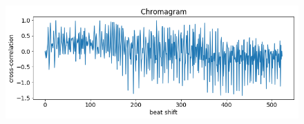 \documentclass[12pt]{FSUBeamer_official}
\begin{document}
\begin{frame}
\begin{itemize}
\begin{figure}[ht]
\begin{minipage}[b]{0.45\linewidth}
			\end{minipage}
			\hspace{0.5cm}
			\begin{minipage}[b]{0.45\linewidth}
				\centering
				\includegraphics[width=\textwidth]{pics/Chroma/beatalignedchroma_corr_mean2_filt.png}
			\end{minipage}
		\end{figure}
	\end{itemize}
\end{frame}
\end{document}
